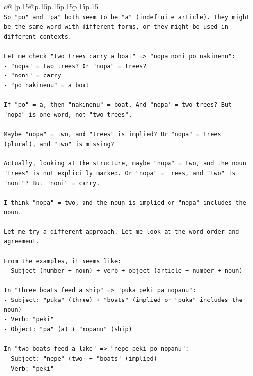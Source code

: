 \documentclass{article}
\begin{document}
{\begin{supertabular}{c@{$\;$}|p{.15\linewidth}@{}p{.15\linewidth}p{.15\linewidth}p{.15\linewidth}p{.15\linewidth}p{.15\linewidth}}
{{{\\ 
\texttt{So "po" and "pa" both seem to be "a" (indefinite article). They might be the same word with different forms, or they might be used in different contexts.} \\
\\ 
\texttt{Let me check "two trees carry a boat" => "nopa noni po nakinenu":} \\
\texttt{{-} "nopa" = two trees? Or "nopa" = trees?} \\
\texttt{{-} "noni" = carry} \\
\texttt{{-} "po nakinenu" = a boat} \\
\\ 
\texttt{If "po" = a, then "nakinenu" = boat. And "nopa" = two trees? But "nopa" is one word, not "two trees".} \\
\\ 
\texttt{Maybe "nopa" = two, and "trees" is implied? Or "nopa" = trees (plural), and "two" is missing?} \\
\\ 
\texttt{Actually, looking at the structure, maybe "nopa" = two, and the noun "trees" is not explicitly marked. Or "nopa" = trees, and "two" is "noni"? But "noni" = carry.} \\
\\ 
\texttt{I think "nopa" = two, and the noun is implied or "nopa" includes the noun.} \\
\\ 
\texttt{Let me try a different approach. Let me look at the word order and agreement.} \\
\\ 
\texttt{From the examples, it seems like:} \\
\texttt{{-} Subject (number + noun) + verb + object (article + number + noun)} \\
\\ 
\texttt{In "three boats feed a ship" => "puka peki pa nopanu":} \\
\texttt{{-} Subject: "puka" (three) + "boats" (implied or "puka" includes the noun)} \\
\texttt{{-} Verb: "peki"} \\
\texttt{{-} Object: "pa" (a) + "nopanu" (ship)} \\
\\ 
\texttt{In "two boats feed a lake" => "nepe peki po nopanu":} \\
\texttt{{-} Subject: "nepe" (two) + "boats" (implied)} \\
\texttt{{-} Verb: "peki"} \\
}}}
\end{supertabular}}
\end{document}
